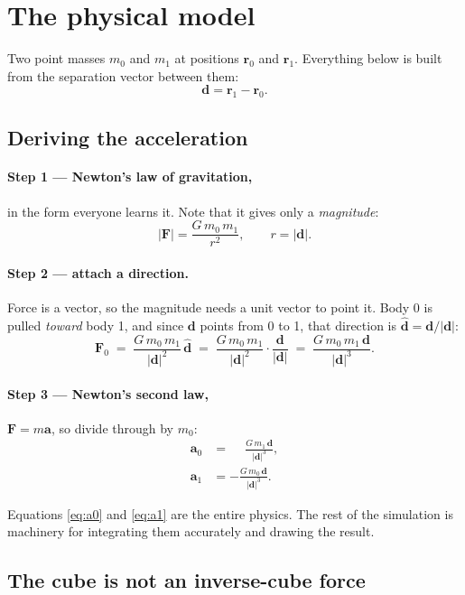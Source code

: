 \documentclass[11pt,a4paper]{article}
\newcommand{\vd}{\mathbf{d}}
\newcommand{\vr}{\mathbf{r}}
\newcommand{\va}{\mathbf{a}}
\newcommand{\vF}{\mathbf{F}}
\newcommand{\dhat}{\hat{\mathbf{d}}}
\begin{document}
\section{The physical model}
\label{sec:model}

Two point masses $m_0$ and $m_1$ at positions $\vr_0$ and $\vr_1$. Everything
below is built from the separation vector between them:
\[
  \vd = \vr_1 - \vr_0 .
\]

\subsection{Deriving the acceleration}

\paragraph{Step 1 --- Newton's law of gravitation,} in the form everyone learns
it. Note that it gives only a \emph{magnitude}:
\[
  |\vF| = \frac{G\,m_0\,m_1}{r^2},
  \qquad r = |\vd| .
\]

\paragraph{Step 2 --- attach a direction.} Force is a vector, so the magnitude
needs a unit vector to point it. Body 0 is pulled \emph{toward} body 1, and
since $\vd$ points from 0 to 1, that direction is $\dhat = \vd/|\vd|$:
\[
  \vF_0 \;=\; \frac{G\,m_0\,m_1}{|\vd|^2}\,\dhat
        \;=\; \frac{G\,m_0\,m_1}{|\vd|^2}\cdot\frac{\vd}{|\vd|}
        \;=\; \frac{G\,m_0\,m_1\,\vd}{|\vd|^3} .
\]

\paragraph{Step 3 --- Newton's second law,} $\vF = m\va$, so divide through by
$m_0$:
\begin{align}
  \va_0 &= \phantom{-}\frac{G\,m_1\,\vd}{|\vd|^3}, \label{eq:a0}\\[2pt]
  \va_1 &= -\frac{G\,m_0\,\vd}{|\vd|^3}. \label{eq:a1}
\end{align}

Equations \eqref{eq:a0} and \eqref{eq:a1} are the entire physics. The rest of
the simulation is machinery for integrating them accurately and drawing the
result.

\subsection{The cube is not an inverse-cube force}
\end{document}
